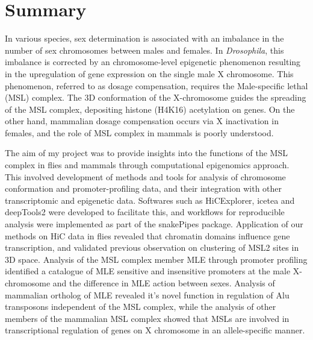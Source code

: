 \documentclass[11pt,twoside]{MPIthesis}
\theoremstyle{definition}
\theoremstyle{definition}
\theoremstyle{definition}
\theoremstyle{remark}
\begin{document}
  \listoffigures


{
  
}


%
\mainmatter %
\pagestyle{fancyplain} %


\chapter{Summary}\label{summary}

 In various species, sex determination is associated
with an imbalance in the number of sex chromosomes between males and
females. In \emph{Drosophila}, this imbalance is corrected by an
chromosome-level epigenetic phenomenon resulting in the upregulation of
gene expression on the single male X chromosome. This phenomenon,
referred to as dosage compensation, requires the Male-specific lethal
(MSL) complex. The 3D conformation of the X-chromosome guides the
spreading of the MSL complex, depositing histone (H4K16) acetylation on
genes. On the other hand, mammalian dosage compensation occurs via X
inactivation in females, and the role of MSL complex in mammals is
poorly understood.

The aim of my project was to provide insights into the functions of the
MSL complex in flies and mammals through computational epigenomics
approach. This involved development of methods and tools for analysis of
chromosome conformation and promoter-profiling data, and their
integration with other transcriptomic and epigenetic data. Softwares
such as HiCExplorer, icetea and deepTools2 were developed to facilitate
this, and workflows for reproducible analysis were implemented as part
of the snakePipes package. Application of our methods on HiC data in
flies revealed that chromatin domains influence gene transcription, and
validated previous observation on clustering of MSL2 sites in 3D space.
Analysis of the MSL complex member MLE through promoter profiling
identified a catalogue of MLE sensitive and insensitive promoters at the
male X-chromosome and the difference in MLE action between sexes.
Analysis of mammalian ortholog of MLE revealed it's novel function in
regulation of Alu transposons independent of the MSL complex, while the
analysis of other members of the mammalian MSL complex showed that MSLs
are involved in transcriptional regulation of genes on X chromosome in
an allele-specific manner.
\end{document}
